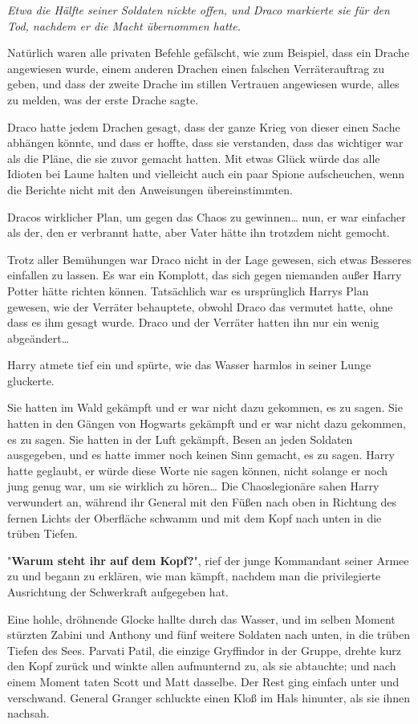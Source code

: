 {\emph{Etwa die Hälfte seiner Soldaten nickte offen, und Draco markierte sie für den Tod, nachdem er die Macht übernommen hatte.}

Natürlich waren alle privaten Befehle gefälscht, wie zum Beispiel, dass ein Drache angewiesen wurde, einem anderen Drachen einen falschen Verräterauftrag zu geben, und dass der zweite Drache im stillen Vertrauen angewiesen wurde, alles zu melden, was der erste Drache sagte.

Draco hatte jedem Drachen gesagt, dass der ganze Krieg von dieser einen Sache abhängen könnte, und dass er hoffte, dass sie verstanden, dass das wichtiger war als die Pläne, die sie zuvor gemacht hatten. Mit etwas Glück würde das alle Idioten bei Laune halten und vielleicht auch ein paar Spione aufscheuchen, wenn die Berichte nicht mit den Anweisungen übereinstimmten.

Dracos wirklicher Plan, um gegen das Chaos zu gewinnen… nun, er war einfacher als der, den er verbrannt hatte, aber Vater hätte ihn trotzdem nicht gemocht.

Trotz aller Bemühungen war Draco nicht in der Lage gewesen, sich etwas Besseres einfallen zu lassen. Es war ein Komplott, das sich gegen niemanden außer Harry Potter hätte richten können. Tatsächlich war es ursprünglich Harrys Plan gewesen, wie der Verräter behauptete, obwohl Draco das vermutet hatte, ohne dass es ihm gesagt wurde. Draco und der Verräter hatten ihn nur ein wenig abgeändert…

Harry atmete tief ein und spürte, wie das Wasser harmlos in seiner Lunge gluckerte.

Sie hatten im Wald gekämpft und er war nicht dazu gekommen, es zu sagen. Sie hatten in den Gängen von Hogwarts gekämpft und er war nicht dazu gekommen, es zu sagen. Sie hatten in der Luft gekämpft, Besen an jeden Soldaten ausgegeben, und es hatte immer noch keinen Sinn gemacht, es zu sagen. Harry hatte geglaubt, er würde diese Worte nie sagen können, nicht solange er noch jung genug war, um sie wirklich zu hören… Die Chaoslegionäre sahen Harry verwundert an, während ihr General mit den Füßen nach oben in Richtung des fernen Lichts der Oberfläche schwamm und mit dem Kopf nach unten in die trüben Tiefen.

"\textbf{Warum steht ihr auf dem Kopf?}", rief der junge Kommandant seiner Armee zu und begann zu erklären, wie man kämpft, nachdem man die privilegierte Ausrichtung der Schwerkraft aufgegeben hat.

Eine hohle, dröhnende Glocke hallte durch das Wasser, und im selben Moment stürzten Zabini und Anthony und fünf weitere Soldaten nach unten, in die trüben Tiefen des Sees. Parvati Patil, die einzige Gryffindor in der Gruppe, drehte kurz den Kopf zurück und winkte allen aufmunternd zu, als sie abtauchte; und nach einem Moment taten Scott und Matt dasselbe. Der Rest ging einfach unter und verschwand. General Granger schluckte einen Kloß im Hals hinunter, als sie ihnen nachsah.

}
